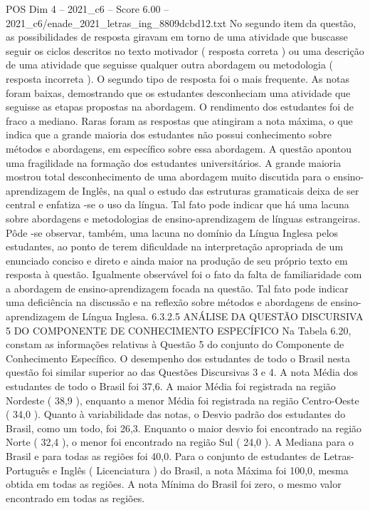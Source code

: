 \begin{textsample}{POS Dim 4 – 2021\_c6 – Score 6.00 – 2021\_c6/enade\_2021\_letras\_ing\_8809dcbd12.txt}
No segundo item da questão, as possibilidades de resposta giravam em torno de uma atividade que buscasse seguir os ciclos descritos no texto motivador ( resposta correta ) ou uma descrição de uma atividade que seguisse qualquer outra abordagem ou metodologia ( resposta incorreta ).
O segundo tipo de resposta foi o mais frequente.
As notas foram baixas, demostrando que os estudantes desconheciam uma atividade que seguisse as etapas propostas na abordagem.
O rendimento dos estudantes foi de fraco a mediano.
Raras foram as respostas que atingiram a nota máxima, o que indica que a grande maioria dos estudantes não possui conhecimento sobre métodos e abordagens, em específico sobre essa abordagem.
A questão apontou uma fragilidade na formação dos estudantes universitários.
A grande maioria mostrou total desconhecimento de uma abordagem muito discutida para o ensino-aprendizagem de Inglês, na qual o estudo das estruturas gramaticais deixa de ser central e enfatiza -se o uso da língua.
Tal fato pode indicar que há uma lacuna sobre abordagens e metodologias de ensino-aprendizagem de línguas estrangeiras.
Pôde -se observar, também, uma lacuna no domínio da Língua Inglesa pelos estudantes, ao ponto de terem dificuldade na interpretação apropriada de um enunciado conciso e direto e ainda maior na produção de seu próprio texto em resposta à questão.
Igualmente observável foi o fato da falta de familiaridade com a abordagem de ensino-aprendizagem focada na questão.
Tal fato pode indicar uma deficiência na discussão e na reflexão sobre métodos e abordagens de ensino-aprendizagem de Língua Inglesa. 6.3.2.5 ANÁLISE DA QUESTÃO DISCURSIVA 5 DO COMPONENTE DE CONHECIMENTO ESPECÍFICO Na Tabela 6.20, constam as informações relativas à Questão 5 do conjunto do Componente de Conhecimento Específico.
O desempenho dos estudantes de todo o Brasil nesta questão foi similar superior ao das Questões Discursivas 3 e 4.
A nota Média dos estudantes de todo o Brasil foi 37,6.
A maior Média foi registrada na região Nordeste ( 38,9 ), enquanto a menor Média foi registrada na região Centro-Oeste ( 34,0 ).
Quanto à variabilidade das notas, o Desvio padrão dos estudantes do Brasil, como um todo, foi 26,3.
Enquanto o maior desvio foi encontrado na região Norte ( 32,4 ), o menor foi encontrado na região Sul ( 24,0 ).
A Mediana para o Brasil e para todas as regiões foi 40,0.
Para o conjunto de estudantes de Letras-Português e Inglês ( Licenciatura ) do Brasil, a nota Máxima foi 100,0, mesma obtida em todas as regiões.
A nota Mínima do Brasil foi zero, o mesmo valor encontrado em todas as regiões.

\end{textsample}
